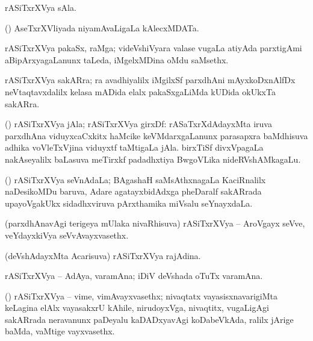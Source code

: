 \bentry
{}
\gl{\nA}
\bmng
rASiTxrXVya sAla. 
\emng
\eentry

\bentry
{}
\gl{\nA}
\bmng
(\AseTxrXV) AseTxrXVliyada niyamAvaLigaLa kAlecxMDATa. 
\emng
\eentry

\bentry
{}
\gl{\nA}
\bmng
rASiTxrXVya pakaSx, raMga; videVshiVyara valase \mo vugaLa \vi atiyAda parxtigAmi aBipArxyagaLanunx taLeda, iMgelxMDina oMdu saMsethx. 
\emng
\eentry

\bentry
{}
\gl{\nA}
\bmng
rASiTxrXVya sakARra; ra avadhiyalilx iMgilxSf parxdhAni mAyxkoDxnAlfDx neVtaqtavxdalilx kelasa mADida elalx pakaSxgaLiMda kUDida okUkxTa sakARra. 
\emng
\eentry

\bentry
{}
\gl{\nA}
\bmng
(\birx) rASiTxrXVya jAla; rASiTxrXVya girxDf: 
\banum
{} rASaTxrXdAdayxMta iruva parxdhAna viduyxcaCxkitx haMcike keVMdarxgaLanunx parasapxra baMdhisuva adhika voVleTxVjina viduyxtf taMtigaLa jAla. 
 birxTiSf divxVpagaLa nakAseyalilx baLasuva meTirxkf padadhxtiya BwgoVLika nideRVshAMkagaLu. 
\eanum
\emng
\eentry

\bentry
{}
\gl{\nA}
\bmng
(\ame) rASiTxrXVya seVnAdaLa; BAgashaH saMsAthxnagaLa KaciRnalilx naDesikoMDu baruva, Adare agatayxbidAdxga pheDaralf sakARrada upayoVgakUkx sidadhxviruva pArxthamika miVsalu seYnayxdaLa. 
\emng
\eentry

\bentry
{}
\gl{\nA}
\bmng
(parxdhAnavAgi terigeya mUlaka nivaRhisuva) rASiTxrXVya -- AroVgayx seVve, veYdayxkiVya seVvAvayxvasethx. 
\emng
\eentry

\bentry
{}
\gl{\nA}
\bmng
(deVshAdayxMta Acarisuva) rASiTxrXVya rajAdina. 
\emng
\eentry

\bentry
{}
\gl{\nA}
\bmng
rASiTxrXVya -- AdAya, varamAna; iDiV deVshada oTuTx varamAna. 
\emng
\eentry

\bentry
{}
\gl{\nA}
\bmng
(\birx) rASiTxrXVya -- vime, vimAvayxvasethx; nivaqtatx vayasisxnavarigiMta keLagina elAlx vayasakxrU kAhile, nirudoyxVga, nivaqtitx, \mo vugaLigAgi sakARrada neravanunx paDeyalu kaDADxyavAgi koDabeVkAda, ralilx jArige baMda, vaMtige vayxvasethx. 
\emng
\eentry


